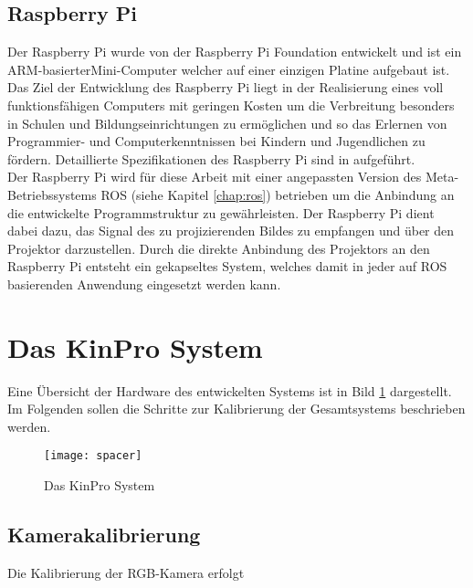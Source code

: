 
\subsection{Raspberry Pi}
Der Raspberry Pi wurde von der Raspberry Pi Foundation  entwickelt und ist ein ARM-basierter\red[fußnote?] Mini-Computer welcher auf einer einzigen Platine aufgebaut ist. Das Ziel der Entwicklung des Raspberry Pi liegt in der Realisierung eines voll funktionsfähigen Computers mit geringen Kosten um die Verbreitung besonders in Schulen und Bildungseinrichtungen zu ermöglichen und so das Erlernen von Programmier- und Computerkenntnissen bei Kindern und Jugendlichen zu fördern. Detaillierte Spezifikationen des Raspberry Pi sind in  aufgeführt.\\
Der Raspberry Pi wird für diese Arbeit mit einer angepassten Version des Meta-Betriebssystems ROS (siehe Kapitel \ref{chap:ros}) betrieben um die Anbindung an die entwickelte Programmstruktur zu gewährleisten. Der Raspberry Pi dient dabei dazu, das Signal des zu projizierenden Bildes zu empfangen und über den Projektor darzustellen. Durch die direkte Anbindung des Projektors an den Raspberry Pi entsteht ein gekapseltes System, welches damit in jeder auf ROS basierenden Anwendung eingesetzt werden kann.

\section{Das KinPro System}
Eine Übersicht der Hardware des entwickelten Systems ist in Bild \ref{fig.kinpro} dargestellt. Im Folgenden sollen die Schritte zur Kalibrierung der Gesamtsystems beschrieben werden.

\begin{figure}[ht]
	\begin{center}
		\texttt{[image: spacer]}
		\caption{Das KinPro System}
		\label{fig.kinpro}
	\end{center}
\end{figure}

\subsection{Kamerakalibrierung}
Die Kalibrierung der RGB-Kamera erfolgt 

